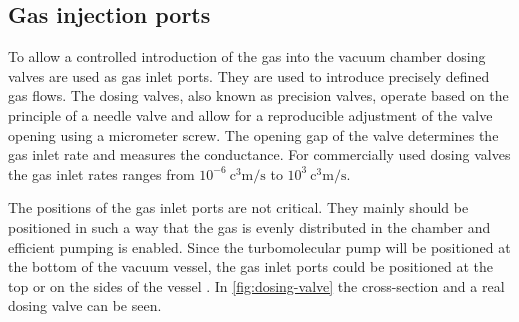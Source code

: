 \subsection{Gas injection ports}

To allow a controlled introduction of the gas into the vacuum chamber dosing valves are used as gas inlet ports.
They are used to introduce precisely defined gas flows.
The dosing valves, also known as precision valves, operate based on the principle of a needle valve and allow for a reproducible adjustment of the valve opening using a micrometer screw.
The opening gap of the valve determines the gas inlet rate and measures the conductance.
For commercially used dosing valves the gas inlet rates ranges from $10^{-6}~\si{\cubic\centi\meter\per\second}$ to $10^{3}~\si{\cubic\centi\meter\per\second}$.

The positions of the gas inlet ports are not critical.
They mainly should be positioned in such a way that the gas is evenly distributed in the chamber and efficient pumping is enabled.
Since the turbomolecular pump will be positioned at the bottom of the vacuum vessel, the gas inlet ports could be positioned at the top or on the sides of the vessel \cite{Wutz2000}. In \autoref{fig:dosing-valve} the cross-section and a real dosing valve can be seen.

